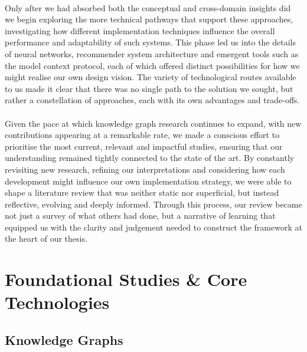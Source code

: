     \newpage
    \paragraph{} Only after we had absorbed both the conceptual and cross-domain insights did we begin exploring the more technical pathways that support these approaches, investigating how different implementation techniques influence the overall performance and adaptability of such systems. This phase led us into the details of neural networks, recommender system architecture and emergent tools such as the model context protocol, each of which offered distinct possibilities for how we might realise our own design vision. The variety of technological routes available to us made it clear that there was no single path to the solution we sought, but rather a constellation of approaches, each with its own advantages and trade-offs.
    
    \paragraph{} Given the pace at which knowledge graph research continues to expand, with new contributions appearing at a remarkable rate, we made a conscious effort to prioritise the most current, relevant and impactful studies, ensuring that our understanding remained tightly connected to the state of the art. By constantly revisiting new research, refining our interpretations and considering how each development might influence our own implementation strategy, we were able to shape a literature review that was neither static nor superficial, but instead reflective, evolving and deeply informed. Through this process, our review became not just a survey of what others had done, but a narrative of learning that equipped us with the clarity and judgement needed to construct the framework at the heart of our thesis.

\newpage
\section{Foundational Studies \& Core Technologies}

    \subsection{Knowledge Graphs}


